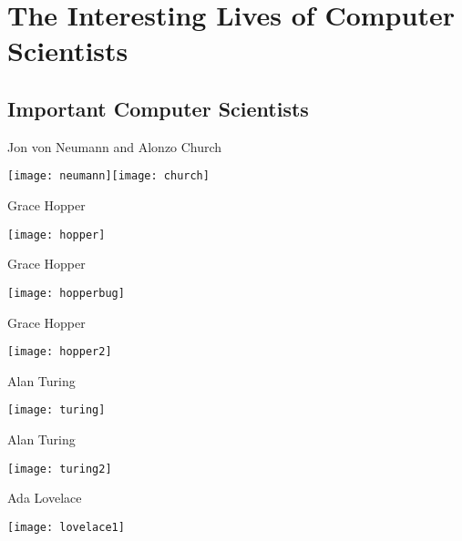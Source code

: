 \section{The Interesting Lives of Computer Scientists}
\subsection{Important Computer Scientists}

\begin{frame}{Jon von Neumann and Alonzo Church}\begin{center}
\texttt{[image: neumann]}\texttt{[image: church]}\end{center}
\end{frame}

\begin{frame}{Grace Hopper}\begin{center}
\texttt{[image: hopper]}\end{center}
\end{frame}

\begin{frame}{Grace Hopper}\begin{center}
\texttt{[image: hopperbug]}\end{center}
\end{frame}

\begin{frame}{Grace Hopper}\begin{center}
\texttt{[image: hopper2]}\end{center}
\end{frame}

\begin{frame}{Alan Turing}\begin{center}
\texttt{[image: turing]}\end{center}
\end{frame}

\begin{frame}{Alan Turing}\begin{center}
\texttt{[image: turing2]}\end{center}
\end{frame}

\begin{frame}{Ada Lovelace}\begin{center}
\texttt{[image: lovelace1]}\end{center}
\end{frame}

